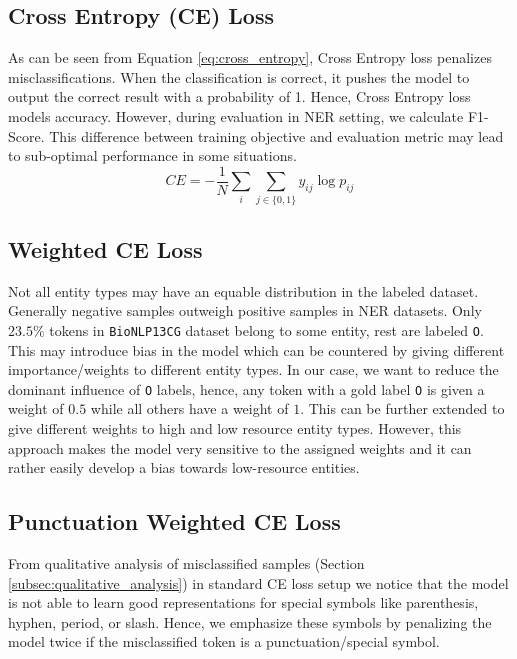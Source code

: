 \subsection{Cross Entropy (CE) Loss}
As can be seen from Equation \eqref{eq:cross_entropy}, Cross Entropy loss penalizes misclassifications. When the classification is correct, it pushes the model to output the correct result with a probability of 1. Hence, Cross Entropy loss models accuracy. However, during evaluation in NER setting, we calculate F1-Score. This difference between training objective and evaluation metric may lead to sub-optimal performance in some situations.
\begin{equation}
\label{eq:cross_entropy}
    CE = -\frac{1}{N}\sum_{i}\sum_{j \in \{0, 1\}} y_{ij}\log p_{ij}
\end{equation}

\subsection{Weighted CE Loss}
Not all entity types may have an equable distribution in the labeled dataset. Generally negative samples outweigh positive samples in NER datasets. Only $23.5\%$ tokens in \texttt{BioNLP13CG} dataset belong to some entity, rest are labeled \texttt{O}. This may introduce bias in the model which can be countered by giving different importance/weights to different entity types. In our case, we want to reduce the dominant influence of \texttt{O} labels, hence, any token with a gold label \texttt{O} is given a weight of $0.5$ while all others have a weight of $1$. This can be further extended to give different weights to high and low resource entity types. However, this approach makes the model very sensitive to the assigned weights and it can rather easily develop a bias towards low-resource entities\cite{valverde2017improving}.

\subsection{Punctuation Weighted CE Loss}
From qualitative analysis of misclassified samples (Section \ref{subsec:qualitative_analysis}) in standard CE loss setup we notice that the model is not able to learn good representations for special symbols like parenthesis, hyphen, period, or slash. Hence, we emphasize these symbols by penalizing the model twice if the misclassified token is a punctuation/special symbol.

